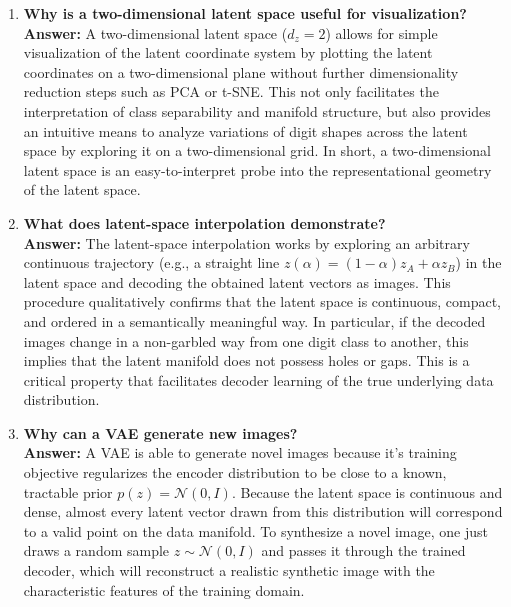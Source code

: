 \documentclass[10pt]{article}
\begin{document}
\begin{enumerate}
\vspace{5mm}

\item \textbf{Why is a two-dimensional latent space useful for visualization?}\\[1.5mm]
\textbf{Answer:} A two-dimensional latent space ($d_z = 2$) allows for simple visualization of the latent coordinate system by plotting the latent coordinates on a two-dimensional plane without further dimensionality reduction steps such as PCA or t-SNE. This not only facilitates the interpretation of class separability and manifold structure, but also provides an intuitive means to analyze variations of digit shapes across the latent space by exploring it on a two-dimensional grid. In short, a two-dimensional latent space is an easy-to-interpret probe into the representational geometry of the latent space.

\vspace{5mm}

\item \textbf{What does latent-space interpolation demonstrate?}\\[1.5mm]
\textbf{Answer:} The latent-space interpolation works by exploring an arbitrary continuous trajectory (e.g., a straight line $z(\alpha) = (1-\alpha)z_A + \alpha z_B$) in the latent space and decoding the obtained latent vectors as images. This procedure qualitatively confirms that the latent space is continuous, compact, and ordered in a semantically meaningful way. In particular, if the decoded images change in a non-garbled way from one digit class to another, this implies that the latent manifold does not possess holes or gaps. This is a critical property that facilitates decoder learning of the true underlying data distribution.

\vspace{5mm}

\item \textbf{Why can a VAE generate new images?}\\[1.5mm]
\textbf{Answer:} A VAE is able to generate novel images because it's training objective regularizes the encoder distribution to be close to a known, tractable prior $p(z) = \mathcal{N}(0, I)$.
Because the latent space is continuous and dense, almost every latent vector drawn from this distribution will correspond to a valid point on the data manifold. To synthesize a novel image, one just draws a random sample $z \sim \mathcal{N}(0, I)$ and passes it through the trained decoder, which will reconstruct a realistic synthetic image with the characteristic features of the training domain.


\end{enumerate}
\end{document}
